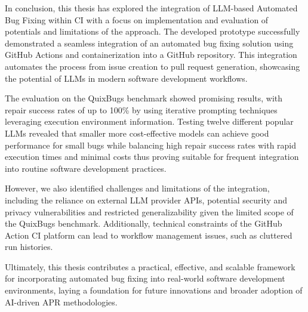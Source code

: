 In conclusion, this thesis has explored the integration of LLM-based Automated Bug Fixing within \acf{CI} with a focus on implementation and evaluation of potentials and limitations of the approach. The developed prototype successfully demonstrated a seamless integration of an automated bug fixing solution using GitHub Actions and containerization into a GitHub repository. This integration automates the process from issue creation to pull request generation, showcasing the potential of LLMs in modern software development workflows.

The evaluation on the QuixBugs benchmark showed promising results, with repair success rates of up to 100\% by using iterative prompting techniques leveraging execution environment information. Testing twelve different popular \acp{LLM} revealed that smaller more cost-effective models
can achieve good performance for small bugs while balancing high repair success rates with rapid execution times and minimal costs thus proving suitable for frequent integration into routine software development practices.

However, we also identified challenges and limitations of the integration, including the reliance on external LLM provider APIs, potential security and privacy vulnerabilities and restricted generalizability given the limited scope of the QuixBugs benchmark. Additionally, technical constraints of the GitHub Action CI platform can lead to workflow management issues, such as cluttered run histories.

Ultimately, this thesis contributes a practical, effective, and scalable framework for incorporating automated bug fixing into real-world software development environments, laying a foundation for future innovations and broader adoption of AI-driven \ac{APR} methodologies.